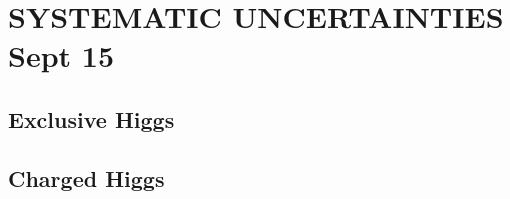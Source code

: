 \chapter{SYSTEMATIC UNCERTAINTIES {\color{red} Sept 15}}

	\section{Exclusive Higgs}

	\section{Charged Higgs}
